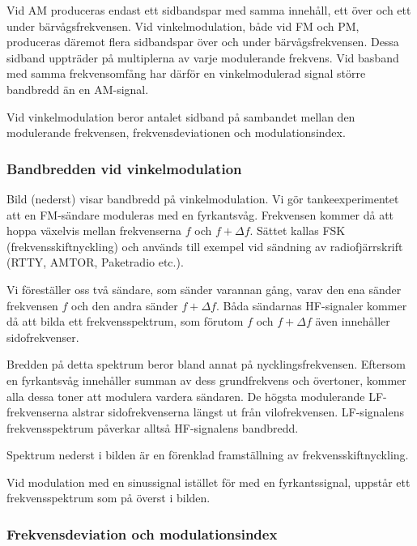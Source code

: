 Vid AM produceras endast ett sidbandspar med samma innehåll, ett över och ett
under bärvågsfrekvensen.
Vid vinkelmodulation, både vid FM och PM, produceras däremot flera sidbandspar
över och under bärvågsfrekvensen.
Dessa sidband uppträder på multiplerna av varje modulerande frekvens.
Vid basband med samma frekvensomfång har därför en vinkelmodulerad signal
större bandbredd än en AM-signal.

Vid vinkelmodulation beror antalet sidband på sambandet mellan den modulerande
frekvensen, frekvensdeviationen och modulationsindex.


\subsubsection{Bandbredden vid vinkelmodulation}

Bild  (nederst) visar bandbredd på vinkelmodulation.
Vi gör tankeexperimentet att en FM-sändare moduleras med en fyrkantsvåg.
Frekvensen kommer då att hoppa växelvis mellan frekvenserna \(f\) och
\(f + \Delta f\).
Sättet kallas FSK (frekvensskiftnyckling) och används till exempel vid sändning
av radiofjärrskrift (RTTY, AMTOR, Paketradio etc.).

Vi föreställer oss två sändare, som sänder varannan gång, varav den ena sänder
frekvensen \(f\) och den andra sänder \(f + \Delta f\).
Båda sändarnas HF-signaler kommer då att bilda ett frekvensspektrum, som
förutom \(f\) och \(f + \Delta f\) även innehåller sidofrekvenser.

Bredden på detta spektrum beror bland annat på nycklingsfrekvensen.
Eftersom en fyrkantsvåg innehåller summan av dess grundfrekvens och övertoner,
kommer alla dessa toner att modulera vardera sändaren.
De högsta modulerande LF-frekvenserna alstrar sidofrekvenserna längst ut från
vilofrekvensen.
LF-signalens frekvensspektrum påverkar alltså HF-signalens bandbredd.

Spektrum nederst i bilden är en förenklad framställning av
frekvensskiftnyckling.

Vid modulation med en sinussignal istället för med en fyrkantssignal, uppstår
ett frekvensspektrum som på överst i bilden.

\subsubsection{Frekvensdeviation och modulationsindex}

